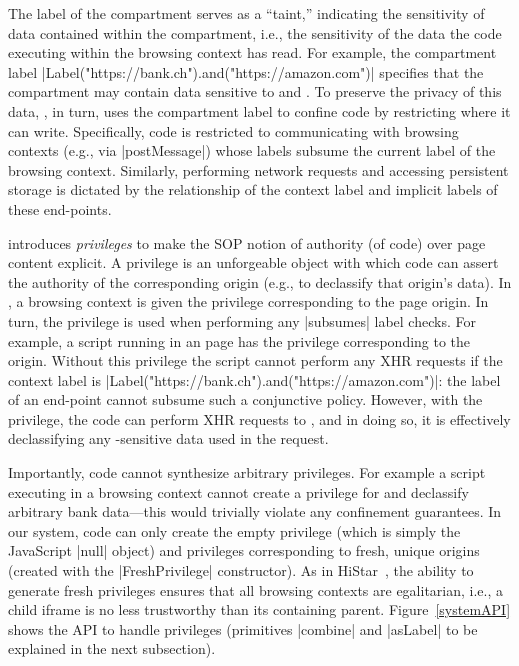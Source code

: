 The label of the compartment serves as a ``taint,'' indicating the
sensitivity of data contained within the compartment, i.e., the
sensitivity of the data the code executing within the browsing context
has read.
%
For example, the compartment label
\js|Label("https://bank.ch").and("https://amazon.com")| specifies that
the compartment may contain data sensitive to  and
.
%
To preserve the privacy of this data, \sys{}, in turn, uses the
compartment label to confine code by restricting where it can write.
%
Specifically, code is restricted to communicating with browsing
contexts (e.g., via \js|postMessage|) whose labels subsume the current
label of the browsing context.
%
Similarly, performing network requests and accessing persistent storage is
dictated by the relationship of the context label and implicit labels of these
end-points.  


\sys{} introduces \emph{privileges} to make the SOP notion of
authority (of code) over page content explicit.
%
A privilege is an unforgeable object with which code can assert the
authority of the corresponding origin (e.g., to declassify that
origin's data).
%
In \sys, a browsing context is given the privilege corresponding to
the page origin.
%
In turn, the privilege is used when performing any \js|subsumes|
label checks.
%
For example, a script running in an  page has the
privilege corresponding to the  origin.
%
Without this privilege the script cannot perform any XHR requests
if the context label is
\js|Label("https://bank.ch").and("https://amazon.com")|:
the label of an end-point cannot subsume such a conjunctive policy.
%
However, with the   privilege, the code can perform
XHR requests to , and in doing so, it is effectively
declassifying any -sensitive data used in the
request.
 
Importantly, code cannot synthesize arbitrary privileges.
%
For example a script executing in a  browsing
context cannot create a privilege for  and declassify
arbitrary bank data---this would trivially violate any confinement
guarantees.
%
In our system, code can only create the empty privilege (which is
simply the JavaScript \js|null| object) and privileges corresponding
to fresh, unique origins (created with the \js|FreshPrivilege|
constructor).
%
As in HiStar~\cite{Zeldovich:2006}, the ability to generate fresh privileges
ensures that all browsing contexts are egalitarian, i.e., a child iframe is no
less trustworthy than its containing parent.  Figure~\ref{systemAPI} shows the
API to handle privileges (primitives \js|combine| and \js|asLabel| to be 
explained in the next subsection). 


